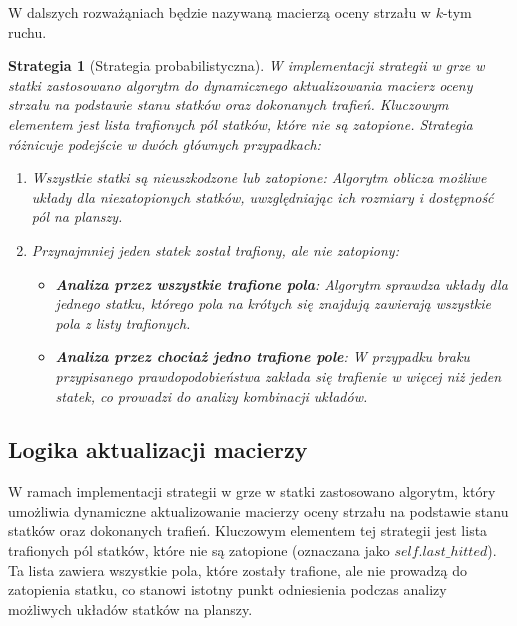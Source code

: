 \documentclass[magisterska]{pracadypl}
\newtheorem{strategy}{Strategia}[section]
\begin{document}
W dalszych rozważąniach będzie nazywaną macierzą oceny strzału w $k$-tym ruchu.

\begin{strategy}[Strategia probabilistyczna]

W implementacji strategii w grze w statki zastosowano algorytm do dynamicznego aktualizowania macierz oceny strzału na podstawie stanu statków oraz dokonanych trafień. Kluczowym elementem jest lista trafionych pól statków, które nie są zatopione. Strategia różnicuje podejście w dwóch głównych przypadkach:
\begin{enumerate}
    \item Wszystkie statki są nieuszkodzone lub zatopione: Algorytm oblicza możliwe układy dla niezatopionych statków, uwzględniając ich rozmiary i dostępność pól na planszy.
    \item Przynajmniej jeden statek został trafiony, ale nie zatopiony:
    \begin{itemize}
        \item \textbf{Analiza przez wszystkie trafione pola}: Algorytm sprawdza układy dla jednego statku, którego pola na krótych się znajdują zawierają wszystkie pola z listy trafionych.
        \item \textbf{Analiza przez chociaż jedno trafione pole}: W przypadku braku przypisanego prawdopodobieństwa zakłada się trafienie w więcej niż jeden statek, co prowadzi do analizy kombinacji układów.
    \end{itemize}
\end{enumerate}
\end{strategy}
\subsection{Logika aktualizacji macierzy}


W ramach implementacji strategii w grze w statki zastosowano algorytm, który umożliwia dynamiczne aktualizowanie macierzy oceny strzału na podstawie stanu statków oraz dokonanych trafień. Kluczowym elementem tej strategii jest lista trafionych pól statków, które nie są zatopione (oznaczana jako $self.last\_hitted$). Ta lista zawiera wszystkie pola, które zostały trafione, ale nie prowadzą do zatopienia statku, co stanowi istotny punkt odniesienia podczas analizy możliwych układów statków na planszy.
\end{document}

